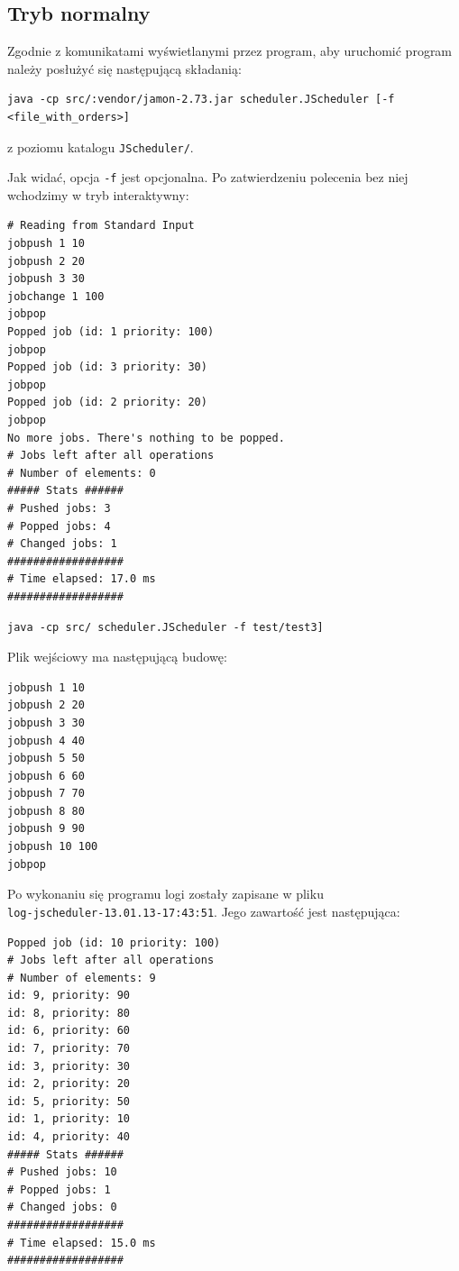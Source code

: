 \documentclass[12pt,a4paper]{article}
\begin{document}
\subsection{Tryb normalny}

Zgodnie z komunikatami wyświetlanymi przez program, aby uruchomić program należy posłużyć się następującą składanią:

\begin{lstlisting}[caption=Opis wywołania progamu]
java -cp src/:vendor/jamon-2.73.jar scheduler.JScheduler [-f <file_with_orders>]
\end{lstlisting}

z poziomu katalogu \texttt{JScheduler/}.

Jak widać, opcja \texttt{-f} jest opcjonalna. Po zatwierdzeniu polecenia bez niej wchodzimy w tryb interaktywny:

\begin{lstlisting}[caption=Przykład wywołania progamu w trybie interaktywnym]
# Reading from Standard Input
jobpush 1 10
jobpush 2 20
jobpush 3 30 
jobchange 1 100
jobpop
Popped job (id: 1 priority: 100)
jobpop
Popped job (id: 3 priority: 30)
jobpop
Popped job (id: 2 priority: 20)
jobpop
No more jobs. There's nothing to be popped.
# Jobs left after all operations
# Number of elements: 0
##### Stats ######
# Pushed jobs: 3
# Popped jobs: 4
# Changed jobs: 1
##################
# Time elapsed: 17.0 ms
##################
\end{lstlisting}

\begin{lstlisting}[caption=Przykład wywołania progamu z plikiem wejściowym]
java -cp src/ scheduler.JScheduler -f test/test3]
\end{lstlisting}

Plik wejściowy ma następującą budowę:

\begin{lstlisting}[caption=Plik testowy test3]
jobpush 1 10
jobpush 2 20
jobpush 3 30
jobpush 4 40
jobpush 5 50
jobpush 6 60
jobpush 7 70
jobpush 8 80
jobpush 9 90
jobpush 10 100
jobpop 
\end{lstlisting}

Po wykonaniu się programu logi zostały zapisane w pliku \\ \texttt{log-jscheduler-13.01.13-17:43:51}. Jego zawartość jest następująca:

\begin{lstlisting}[caption=Zawartość pliku wynikowego]
Popped job (id: 10 priority: 100)
# Jobs left after all operations
# Number of elements: 9
id: 9, priority: 90
id: 8, priority: 80
id: 6, priority: 60
id: 7, priority: 70
id: 3, priority: 30
id: 2, priority: 20
id: 5, priority: 50
id: 1, priority: 10
id: 4, priority: 40
##### Stats ######
# Pushed jobs: 10
# Popped jobs: 1
# Changed jobs: 0
##################
# Time elapsed: 15.0 ms
##################
\end{lstlisting}
\end{document}
